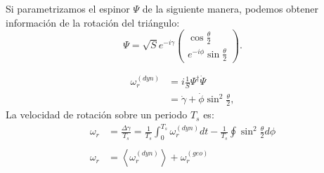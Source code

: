 \documentclass[xcolor=dvipsnames]{beamer}
\begin{document}
\begin{frame}
Si parametrizamos el espinor $\Psi$ de la siguiente manera, podemos obtener información de la rotación del triángulo:
\small
\begin{equation*}
\Psi = \sqrt{S}e^{-i\gamma} \begin{pmatrix}\cos{\frac{\theta}{2}}\\
e^{-i\phi}\sin{\frac{\theta}{2}}\end{pmatrix}.
\end{equation*}

\begin{align*}
\omega_r^{(dyn)} &= i\frac{1}{S}\Psi^\dagger\dot{\Psi} \\
&= \dot{\gamma}+\dot{\phi}\sin^2{\frac{\theta}{2}},
\end{align*}
\normalsize
La velocidad de rotación sobre un periodo $T_s$ es:
\small
\begin{align*}
\omega_r &= \frac{\Delta \gamma}{T_s} = \frac{1}{T_s}\int_0^{T_s}\omega_r^{(dyn)}dt -\frac{1}{T_s}\oint\sin^2{\frac{\theta}{2}}d\phi\\
\\
\omega_r &= \left\langle \omega_r^{(dyn)} \right\rangle + \omega_r^{(geo)}\\
\end{align*}
\normalsize


\end{frame}

\end{document}
